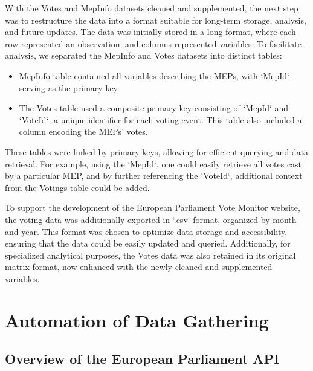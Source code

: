 \documentclass[a4paper,12pt]{report}
\begin{document}
            With the Votes and MepInfo datasets cleaned and supplemented, the next step was to restructure the data into
            a
            format suitable for long-term storage, analysis, and future updates.
            The data was initially stored in a long
            format,
            where each row represented an observation, and columns represented variables.
            To facilitate analysis, we
            separated
            the MepInfo and Votes datasets into distinct tables:
            \begin{itemize}
                \item
                MepInfo table contained all variables describing the MEPs, with `MepId` serving as the primary key.
                \item
                The Votes table used a composite primary key consisting of `MepId` and `VoteId`, a unique identifier for
                each
                voting event.
                This table also included a column encoding the MEPs' votes.
            \end{itemize}

            These tables were linked by primary keys, allowing for efficient querying and data retrieval. For example,
            using the
            `MepId`, one could easily retrieve all votes cast by a particular MEP, and by further referencing the
            `VoteId`,
            additional context from the Votings table could be added.

            To support the development of the European Parliament Vote Monitor website, the voting data was additionally
            exported in `.csv` format, organized by month and year. This format was chosen to optimize data storage and
            accessibility, ensuring that the data could be easily updated and queried. Additionally, for specialized
            analytical
            purposes, the Votes data was also retained in its original matrix format, now enhanced with the newly
            cleaned and
            supplemented variables.


    \chapter{Automation of Data Gathering}\label{ch:automation-of-data-gathering}


        \section{Overview of the European Parliament API}\label{sec:overview-of-the-european-parliament-api}
\end{document}
